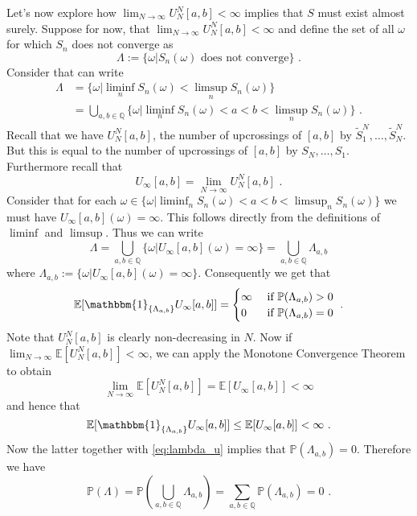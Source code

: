\documentclass[phd]{UWMThesis}
\renewcommand{\P}{\mathbb{P}}
\newcommand{\E}{\mathbb{E}}
\newcommand{\StN}[1]{\tilde{S}_{#1}^N}
\newcommand{\UNab}[1]{U_{#1}^N[a,b]}
\newcommand{\I}[1]{{\mathbbm{1}_{\{#1\}}}}
\newcommand{\mdot}{\textrm{ .}}
\renewcommand{\.}{\textrm{ .}}
\theoremstyle{definition}
\numberwithin{thm}{chapter}
\begin{document}
%
Let's now explore how $\lim_{N\to\infty}\UNab{N}<\infty$ implies that $S$ must exist almost surely. Suppose for now, that $\lim_{N\to\infty}\UNab{N}<\infty$ and define the set of all $\omega$ for which $S_n$ does not converge as
$$\Lambda := \{\omega | S_n(\omega) \textrm{ does not converge}\}\mdot$$
%
Consider that can write
\begin{align*}
\Lambda &= \{\omega | \liminf_{n}S_n(\omega) < \limsup_{n} S_n(\omega)\}\\
&= \bigcup_{a,b\in\mathbb{Q}}\{\omega | \liminf_{n}S_n(\omega) < a < b < \limsup_{n} S_n(\omega)\}\mdot
\end{align*}
%  
Recall that we have $\UNab{N}$, the number of upcrossings of $[a,b]$ by $\StN{1}, \dots, \StN{N}$. But this is equal to the number of upcrossings of $[a,b]$ by $S_N, \dots, S_1$. Furthermore recall that 
$$U_\infty[a,b] = \lim\limits_{N\to\infty} \UNab{N}\mdot$$
%
Consider that for each $\omega \in \{\omega | \liminf_{n}S_n(\omega) < a < b < \limsup_{n} S_n(\omega)\}$ we must have $U_{\infty}[a,b](\omega) = \infty$. This follows directly from the definitions of $\liminf$ and $\limsup$. Thus we can write
\begin{equation*}
\Lambda = \bigcup_{a,b\in\mathbb{Q}}\{ \omega | U_\infty[a,b](\omega) = \infty\} = \bigcup_{a,b\in\mathbb{Q}} \Lambda_{a,b}
\end{equation*}
where $\Lambda_{a,b} := \{ \omega | U_\infty[a,b](\omega) = \infty\}$.
%
Consequently we get that
\begin{equation}
\E[\I{\Lambda_{a,b}} U_\infty[a,b]] = \begin{cases}
\infty &\textrm{ if } \P(\Lambda_{a,b})>0\\
0 &\textrm{ if } \P(\Lambda_{a,b})=0\\
\end{cases}\mdot
\label{eq:lambda_u}
\end{equation}
%
Note that $\UNab{N}$ is clearly non-decreasing in $N$. Now if $\lim_{N\to\infty}\E[\UNab{N}]<\infty$, we can apply the Monotone Convergence Theorem  to obtain
$$\lim\limits_{N\to\infty}\E[\UNab{N}] = \E[U_\infty[a,b]] <\infty$$	
%	
and hence that
$$\E[\I{\Lambda_{a,b}} U_\infty[a,b]] \leq \E[U_\infty[a,b]] < \infty\mdot$$
%
Now the latter together with \eqref{eq:lambda_u} implies that $\P(\Lambda_{a,b}) = 0$. Therefore we have
\begin{equation*}
\P(\Lambda) = \P\left(\bigcup_{a,b\in\mathbb{Q}}\Lambda_{a,b}\right) = \sum_{a,b \in \mathbb{Q}} \P(\Lambda_{a,b}) = 0 \mdot
\end{equation*}
\end{document}
